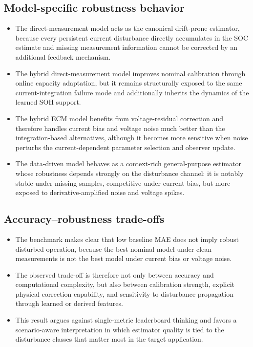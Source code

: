 \documentclass[review,nopreprintline]{elsarticle}
\begin{document}
\subsection{Model-specific robustness behavior}
\begin{itemize}[leftmargin=*]
    \item The direct-measurement model acts as the canonical drift-prone estimator, because every persistent current disturbance directly accumulates in the SOC estimate and missing measurement information cannot be corrected by an additional feedback mechanism.
    \item The hybrid direct-measurement model improves nominal calibration through online capacity adaptation, but it remains structurally exposed to the same current-integration failure mode and additionally inherits the dynamics of the learned SOH support.
    \item The hybrid ECM model benefits from voltage-residual correction and therefore handles current bias and voltage noise much better than the integration-based alternatives, although it becomes more sensitive when noise perturbs the current-dependent parameter selection and observer update.
    \item The data-driven model behaves as a context-rich general-purpose estimator whose robustness depends strongly on the disturbance channel: it is notably stable under missing samples, competitive under current bias, but more exposed to derivative-amplified noise and voltage spikes.
\end{itemize}

\subsection{Accuracy--robustness trade-offs}
\begin{itemize}[leftmargin=*]
    \item The benchmark makes clear that low baseline MAE does not imply robust disturbed operation, because the best nominal model under clean measurements is not the best model under current bias or voltage noise.
    \item The observed trade-off is therefore not only between accuracy and computational complexity, but also between calibration strength, explicit physical correction capability, and sensitivity to disturbance propagation through learned or derived features.
    \item This result argues against single-metric leaderboard thinking and favors a scenario-aware interpretation in which estimator quality is tied to the disturbance classes that matter most in the target application.
\end{itemize}
\end{document}
